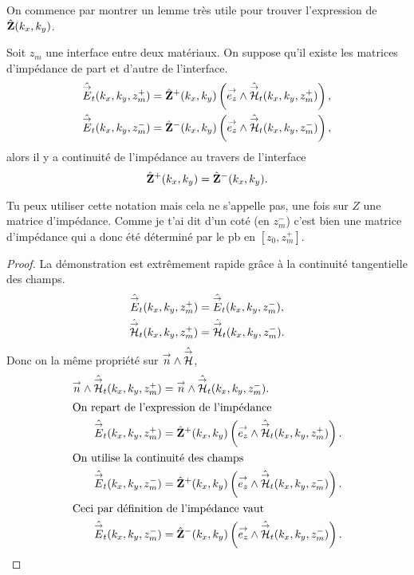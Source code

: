         On commence par montrer un lemme très utile pour trouver l'expression de \(\hat {\mathbf{Z}}(k_x,k_y)\).
        \begin{lemme}
          \label{lem:plan:continuite_impedance}
          Soit \(z_m\) une interface entre deux matériaux. On suppose qu'il existe les matrices d'impédance de part et d'autre de l'interface.
          \begin{align*}
              \hat{{\overset{\rightarrow}{E}}}_t(k_x,k_y,z_m^+) &= \hat{\mathbf{Z}}^+(k_x,k_y) \left({\overset{\rightarrow}{e_z}} \wedge \hat{{\overset{\rightarrow}{\mathcal{H}}}}_t(k_x,k_y,z_m^+)\right),
              \\
              \hat{{\overset{\rightarrow}{E}}}_t(k_x,k_y,z_m^-) &= \hat{\mathbf{Z}}^-(k_x,k_y) \left({\overset{\rightarrow}{e_z}} \wedge \hat{{\overset{\rightarrow}{\mathcal{H}}}}_t(k_x,k_y,z_m^-)\right),
          \end{align*}
          alors il y a continuité de l'impédance au travers de l'interface
          \begin{equation*}
          \hat {\mathbf{Z}}^+(k_x,k_y) = \hat {\mathbf{Z}}^-(k_x,k_y).
          \end{equation*}
        \end{lemme}

        \begin{REM}
          Tu peux utiliser  cette notation mais cela ne s'appelle pas, une fois sur \(Z\) une matrice d'impédance.
          Comme je t'ai dit d'un coté (en \(z_m^-\)) c'est bien une matrice d'impédance qui a donc été déterminé par le pb en \([z_0,z_m^+]\).
        \end{REM}

        \begin{proof}
          La démonstration est extrêmement rapide grâce à la continuité tangentielle des champs.
          \begin{align*}
            \hat{{\overset{\rightarrow}{E}}}_t(k_x,k_y,z_m^+) &= \hat{{\overset{\rightarrow}{E}}}_t(k_x,k_y,z_m^-),
            \\
            \hat{{\overset{\rightarrow}{\mathcal{H}}}}_t(k_x,k_y,z_m^+) &= \hat{{\overset{\rightarrow}{\mathcal{H}}}}_t(k_x,k_y,z_m^-).
          \end{align*}
          Donc on la même propriété sur \({\overset{\rightarrow}{n}} \wedge \hat{{\overset{\rightarrow}{\mathcal{H}}}}\),
          \begin{align*}                
            {\overset{\rightarrow}{n}} \wedge \hat{{\overset{\rightarrow}{\mathcal{H}}}}_t(k_x,k_y,z_m^+) &= {\overset{\rightarrow}{n}} \wedge \hat{{\overset{\rightarrow}{\mathcal{H}}}}_t(k_x,k_y,z_m^-).
            \\
            \intertext{On repart de l'expression de l'impédance}
            \hat{{\overset{\rightarrow}{E}}}_t(k_x,k_y,z_m^+) &= \hat{\mathbf{Z}}^+(k_x,k_y) \left({\overset{\rightarrow}{e_z}} \wedge \hat{{\overset{\rightarrow}{\mathcal{H}}}}_t(k_x,k_y,z_m^+)\right).
            \\
            \intertext{On utilise la continuité des champs}
            \hat{{\overset{\rightarrow}{E}}}_t(k_x,k_y,z_m^-) &= \hat{\mathbf{Z}}^+(k_x,k_y) \left({\overset{\rightarrow}{e_z}} \wedge \hat{{\overset{\rightarrow}{\mathcal{H}}}}_t(k_x,k_y,z_m^-)\right).
            \\
            \intertext{Ceci par définition de l'impédance vaut}
            \hat{{\overset{\rightarrow}{E}}}_t(k_x,k_y,z_m^-) &= \hat{\mathbf{Z}}^-(k_x,k_y) \left({\overset{\rightarrow}{e_z}} \wedge \hat{{\overset{\rightarrow}{\mathcal{H}}}}_t(k_x,k_y,z_m^-)\right).
          \end{align*}
        \end{proof}

